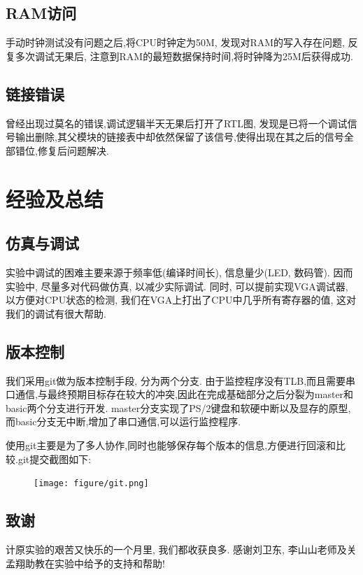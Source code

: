 \subsection{RAM访问}
手动时钟测试没有问题之后,将CPU时钟定为50M,
发现对RAM的写入存在问题,
反复多次调试无果后, 注意到RAM的最短数据保持时间,将时钟降为25M后获得成功.
\subsection{链接错误}
曾经出现过莫名的错误,调试逻辑半天无果后打开了RTL图,
发现是已将一个调试信号输出删除,其父模块的链接表中却依然保留了该信号,使得出现在其之后的信号全部错位,修复后问题解决.

\section{经验及总结}
\subsection{仿真与调试}
  实验中调试的困难主要来源于频率低(编译时间长), 信息量少(LED, 数码管).
  因而实验中, 尽量多对代码做仿真, 以减少实际调试.
  同时, 可以提前实现VGA调试器, 以方便对CPU状态的检测, 我们在VGA上打出了CPU中几乎所有寄存器的值,
  这对我们的调试有很大帮助.

\subsection{版本控制}
我们采用git做为版本控制手段, 分为两个分支.
由于监控程序没有TLB,而且需要串口通信,与最终预期目标存在较大的冲突,因此在完成基础部分之后分裂为master和basic两个分支进行开发.
master分支实现了PS/2键盘和软硬中断以及显存的原型,而basic分支无中断,增加了串口通信,可以运行监控程序.

使用git主要是为了多人协作,同时也能够保存每个版本的信息,方便进行回滚和比较.git提交截图如下:
\begin{figure}[H]
  \centering
  \texttt{[image: figure/git.png]}
\end{figure}


\subsection{致谢}
计原实验的艰苦又快乐的一个月里, 我们都收获良多.
感谢刘卫东, 李山山老师及关孟翔助教在实验中给予的支持和帮助!

